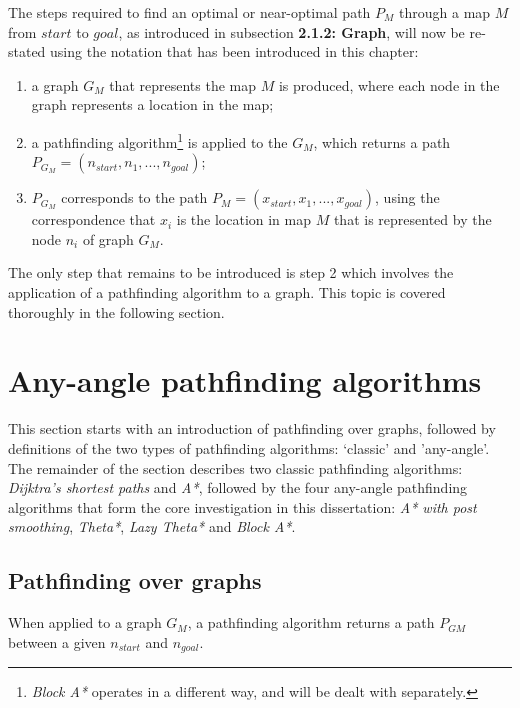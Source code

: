 \documentclass[12pt,notitlepage]{report}
\begin{document}
\noindent
The steps required to find an optimal or near-optimal path $P_{M}$ through a map $M$ from $start$ to $goal$, as introduced in subsection {\bfseries 2.1.2: Graph}, will now be re-stated using the notation that has been introduced in this chapter:
\begin{enumerate}
\item a graph $G_{M}$ that represents the map $M$ is produced, where each node in the graph represents a location in the map; 
\item a pathfinding algorithm\footnote{{\em Block A*} operates in a different way, and will be dealt with separately.} is applied to the $G_{M}$, which returns a path $P_{G_{M}} = (n_{start},n_{1},...,n_{goal})$;
\item $P_{G_{M}}$ corresponds to the path $P_{M} = (x_{start},x_{1},...,x_{goal})$, using the correspondence that $x_{i}$ is the location in map $M$ that is represented by the node $n_{i}$ of graph $G_{M}$.
\end{enumerate}

\noindent
The only step that remains to be introduced is step 2 which involves the application of a pathfinding algorithm to a graph. This topic is covered thoroughly in the following section.

\section{Any-angle pathfinding algorithms}

\noindent
This section starts with an introduction of pathfinding over graphs, followed by definitions of the two types of pathfinding algorithms: `classic' and 'any-angle'. The remainder of the section describes two classic pathfinding algorithms: {\em Dijktra's shortest paths}\cite{Dij59} and {\em A*}\cite{Hart68}, followed by the four any-angle pathfinding algorithms that form the core investigation in this dissertation: {\em A* with post smoothing}, {\em Theta*}, {\em Lazy Theta*} and {\em Block A*}.

\subsection{Pathfinding over graphs}

When applied to a graph $G_{M}$, a pathfinding algorithm returns a path $P_{G{M}}$ between a given $n_{start}$ and $n_{goal}$.\\
\end{document}
